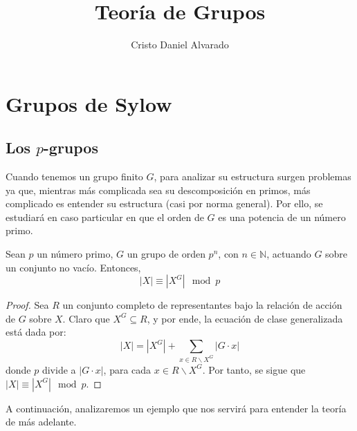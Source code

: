 \documentclass[12pt]{report}
\theoremstyle{largebreak}
\begin{document}
    \title{Teoría de Grupos}
    \author{Cristo Daniel Alvarado}
    \maketitle

    \tableofcontents %

    
    \setcounter{chapter}{6}

    \chapter{Grupos de Sylow}
    
    \section{Los $p$-grupos}
    
    Cuando tenemos un grupo finito $G$, para analizar su estructura surgen problemas ya que, mientras más complicada sea su descomposición en primos, más complicado es entender su estructura (casi por norma general). Por ello, se estudiará en caso particular en que el orden de $G$ es una potencia de un número primo.

    \begin{propo}
        Sean $p$ un número primo, $G$ un grupo de orden $p^n$, con $n\in\mathbb{N}$, actuando $G$ sobre un conjunto no vacío. Entonces,
        \begin{equation*}
            |X|\equiv|X^G|\mod p
        \end{equation*}
    \end{propo}

    \begin{proof}
        Sea $R$ un conjunto completo de representantes bajo la relación de acción de $G$ sobre $X$. Claro que $X^G\subseteq R$, y por ende, la ecuación de clase generalizada está dada por:
        \begin{equation*}
            |X|=|X^G|+\sum_{x\in R\backslash X^G}|G\cdot x|
        \end{equation*}
        donde $p$ divide a $|G\cdot x|$, para cada $x\in R\backslash X^G$. Por tanto, se sigue que $|X|\equiv|X^G|\mod p$.
    \end{proof}

    A continuación, analizaremos un ejemplo que nos servirá para entender la teoría de más adelante.
\end{document}
